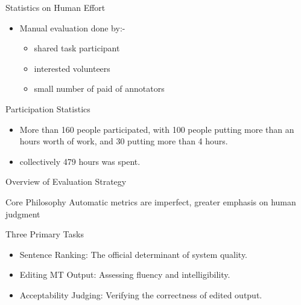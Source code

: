 \begin{frame}{Statistics on Human Effort}

\begin{itemize}
    \item Manual evaluation done by:-
    \begin{itemize}
        \item shared task participant
        \item interested volunteers
        \item small number of paid of annotators
    \end{itemize}
\end{itemize}

\vfill

\begin{block}{Participation Statistics}
\begin{itemize}
    \item More than 160 people participated, with 100 people putting more than an hours worth of work, and 30 putting more than 4 hours.
    \item collectively 479 hours was spent.
\end{itemize}
\end{block}

\end{frame}


\begin{frame}{Overview of Evaluation Strategy}

\begin{block}{Core Philosophy}
Automatic metrics are imperfect, greater emphasis on human judgment 
\end{block}

\vfill

\begin{block}{Three Primary Tasks}
\begin{itemize}
    \item Sentence Ranking: The official determinant of system quality.
    \item Editing MT Output: Assessing fluency and intelligibility.
    \item Acceptability Judging: Verifying the correctness of edited output.
\end{itemize}
\end{block}

\end{frame}


